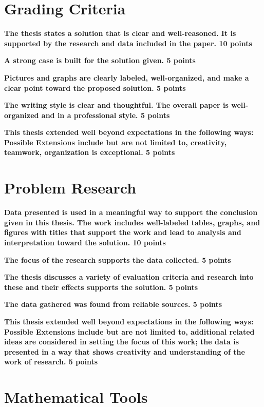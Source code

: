\section{Grading Criteria}

\textbf{The thesis states a solution that is clear and well-reasoned. It is supported by the research and data included in the paper. 10 points}

\textbf{A strong case is built for the solution given. 5 points}

\textbf{Pictures and graphs are clearly labeled, well-organized, and make a clear point toward the proposed solution. 5 points}

\textbf{The writing style is clear and thoughtful. The overall paper is well-organized and in a professional style. 5 points}

\textbf{This thesis extended well beyond expectations in the following ways: Possible Extensions include but are not limited to, creativity, teamwork, organization is exceptional. 5 points}

\section{Problem Research}

\textbf{Data presented is used in a meaningful way to support the conclusion given in this thesis. The work includes well-labeled tables, graphs, and figures with titles that support the work and lead to analysis and interpretation toward the solution. 10 points}

\textbf{The focus of the research supports the data collected. 5 points}

\textbf{The thesis discusses a variety of evaluation criteria and research into these and their effects supports the solution. 5 points}

\textbf{The data gathered was found from reliable sources. 5 points}

\textbf{This thesis extended well beyond expectations in the following ways: Possible Extensions include but are not limited to, additional related ideas are considered in setting the focus of this work; the data is presented in a way that shows creativity and understanding of the work of research. 5 points}

\section{Mathematical Tools}

